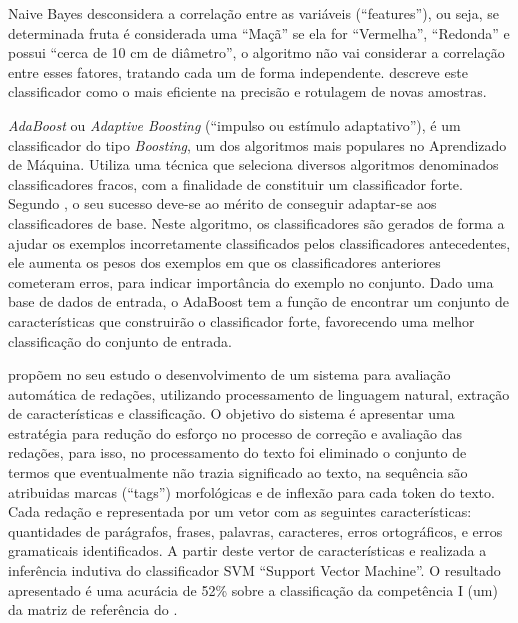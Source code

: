 \noindent Naive Bayes desconsidera a correlação entre 
as variáveis (``features''), ou seja, se determinada fruta é considerada uma 
``Maçã'' se ela for ``Vermelha'', ``Redonda'' e possui ``cerca de 10 cm 
de diâmetro'', o algoritmo não vai considerar a correlação entre esses fatores, 
tratando cada um de forma independente. 
 descreve este classificador como o mais 
eficiente na precisão e rotulagem de novas amostras. 

\textit{AdaBoost} ou \textit{Adaptive Boosting} (``impulso ou estímulo 
adaptativo''), é um classificador do tipo \textit{Boosting}, um dos algoritmos 
mais populares no Aprendizado de Máquina. Utiliza uma técnica que seleciona 
diversos algoritmos denominados classificadores fracos, com a finalidade de 
constituir um classificador forte. Segundo , o seu 
sucesso deve-se ao mérito de conseguir adaptar-se aos classificadores de base. 
Neste algoritmo, os classificadores são gerados de forma a ajudar os exemplos 
incorretamente classificados pelos classificadores antecedentes, ele aumenta os 
pesos dos exemplos em que os classificadores anteriores cometeram erros, para 
indicar importância do exemplo no conjunto. Dado uma base de dados de entrada, 
o AdaBoost tem a função de encontrar um conjunto de características que 
construirão o classificador forte, favorecendo uma melhor classificação do 
conjunto de entrada.

 propõem no seu estudo o desenvolvimento de um 
sistema para avaliação automática de redações, utilizando processamento de 
linguagem natural, extração de características e classificação. O objetivo do 
sistema é apresentar uma estratégia para redução do esforço no processo de 
correção e avaliação das redações, para isso, no processamento do texto foi 
eliminado o conjunto de termos que eventualmente não trazia significado ao 
texto, na sequência são atribuidas marcas (``tags'') morfológicas e de inflexão 
para cada token do texto. Cada redação e representada por um vetor com as 
seguintes características: quantidades de parágrafos, frases, palavras, 
caracteres, erros ortográficos, e erros gramaticais identificados. A partir 
deste vertor de características e realizada a inferência indutiva do 
classificador SVM ``Support Vector Machine''. O resultado apresentado é uma 
acurácia de 52\% sobre a classificação da competência I (um) da matriz de 
referência do \citeauthor{edital_enem:2016}.